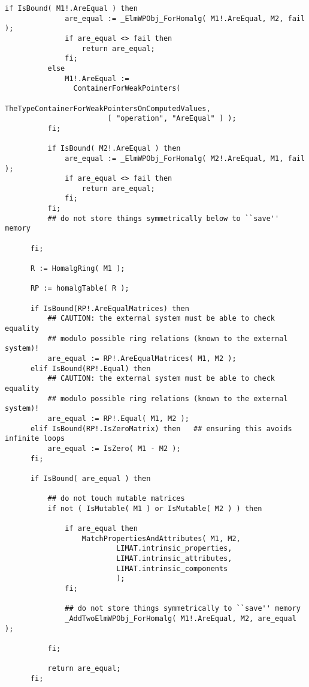 \documentclass[a4paper,11pt]{report}
\begin{document}
{{{\begin{Verbatim}[fontsize=\small,frame=single,label=Code]
          if IsBound( M1!.AreEqual ) then
              are_equal := _ElmWPObj_ForHomalg( M1!.AreEqual, M2, fail );
              if are_equal <> fail then
                  return are_equal;
              fi;
          else
              M1!.AreEqual :=
                ContainerForWeakPointers(
                        TheTypeContainerForWeakPointersOnComputedValues,
                        [ "operation", "AreEqual" ] );
          fi;
          
          if IsBound( M2!.AreEqual ) then
              are_equal := _ElmWPObj_ForHomalg( M2!.AreEqual, M1, fail );
              if are_equal <> fail then
                  return are_equal;
              fi;
          fi;
          ## do not store things symmetrically below to ``save'' memory
          
      fi;
      
      R := HomalgRing( M1 );
      
      RP := homalgTable( R );
      
      if IsBound(RP!.AreEqualMatrices) then
          ## CAUTION: the external system must be able to check equality
          ## modulo possible ring relations (known to the external system)!
          are_equal := RP!.AreEqualMatrices( M1, M2 );
      elif IsBound(RP!.Equal) then
          ## CAUTION: the external system must be able to check equality
          ## modulo possible ring relations (known to the external system)!
          are_equal := RP!.Equal( M1, M2 );
      elif IsBound(RP!.IsZeroMatrix) then   ## ensuring this avoids infinite loops
          are_equal := IsZero( M1 - M2 );
      fi;
      
      if IsBound( are_equal ) then
          
          ## do not touch mutable matrices
          if not ( IsMutable( M1 ) or IsMutable( M2 ) ) then
              
              if are_equal then
                  MatchPropertiesAndAttributes( M1, M2,
                          LIMAT.intrinsic_properties,
                          LIMAT.intrinsic_attributes,
                          LIMAT.intrinsic_components
                          );
              fi;
              
              ## do not store things symmetrically to ``save'' memory
              _AddTwoElmWPObj_ForHomalg( M1!.AreEqual, M2, are_equal );
              
          fi;
          
          return are_equal;
      fi;
      

\end{Verbatim}}}}
\end{document}
